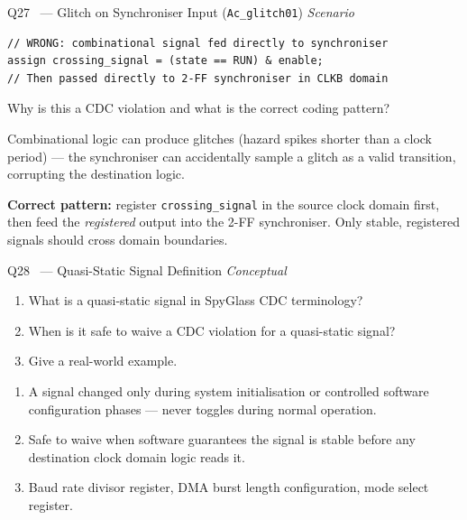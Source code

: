 \documentclass[12pt,a4paper]{article}
\newcommand{\advanced}{%
  \fbox{\textcolor{advred}{\bfseries\sffamily\small ADVANCED}}}
\newcommand{\moderate}{%
  \fbox{\textcolor{modoran}{\bfseries\sffamily\small MODERATE}}}
\begin{document}
\begin{questionbox}{Q27 \advanced\ --- Glitch on Synchroniser Input (\texttt{Ac\_glitch01}) \hfill\textit{Scenario}}

\begin{lstlisting}[style=verilogstyle]
// WRONG: combinational signal fed directly to synchroniser
assign crossing_signal = (state == RUN) & enable;
// Then passed directly to 2-FF synchroniser in CLKB domain
\end{lstlisting}

Why is this a CDC violation and what is the correct coding pattern?
\end{questionbox}

\begin{answerbox}
Combinational logic can produce glitches (hazard spikes shorter than a clock period) --- the synchroniser can accidentally sample a glitch as a valid transition, corrupting the destination logic.

\textbf{Correct pattern:} register \texttt{crossing\_signal} in the source clock domain first, then feed the \emph{registered} output into the 2-FF synchroniser. Only stable, registered signals should cross domain boundaries.
\end{answerbox}

\begin{questionbox}{Q28 \moderate\ --- Quasi-Static Signal Definition \hfill\textit{Conceptual}}
\begin{enumerate}[label=\textbf{\alph*)}]
  \item What is a quasi-static signal in SpyGlass CDC terminology?
  \item When is it safe to waive a CDC violation for a quasi-static signal?
  \item Give a real-world example.
\end{enumerate}
\end{questionbox}

\begin{answerbox}
\begin{enumerate}[label=\textbf{\alph*)}]
  \item A signal changed only during system initialisation or controlled software configuration phases --- never toggles during normal operation.
  \item Safe to waive when software guarantees the signal is stable before any destination clock domain logic reads it.
  \item Baud rate divisor register, DMA burst length configuration, mode select register.
\end{enumerate}
\end{answerbox}
\end{document}
